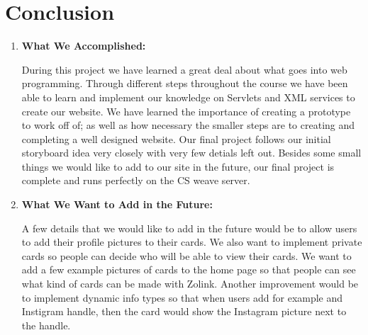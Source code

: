 \documentclass[12pt]{article}%
\begin{document}
\section{Conclusion}
\begin{enumerate}[7.a.]
	
	\item {\bf What We Accomplished:} 
	
	During this project we have learned a great deal about what goes into web programming. Through different steps throughout the course we have been able
	to learn and implement our knowledge on Servlets and XML services to create our website. We have learned the importance of creating a prototype to work
	off of; as well as how necessary the smaller steps are to creating and completing a well designed website. Our final project follows our initial storyboard idea
	very closely with very few detials left out. Besides some small things we would like to add to our site in the future, our final project is complete and runs 
	perfectly on the CS weave server. 
	
	\item {\bf What We Want to Add in the Future:}
	
	A few details that we would like to add in the future would be to allow users to add their profile pictures to their cards. We also want to implement private
	cards so people can decide who will be able to view their cards. We want to add a few example pictures of cards to the home page so that people can 
	see what kind of cards can be made with Zolink. Another improvement would be to implement dynamic info types so that when users add for example
	and Instigram handle, then the card would show the Instagram picture next to the handle. 
	
	
\end{enumerate}

\end{document}
